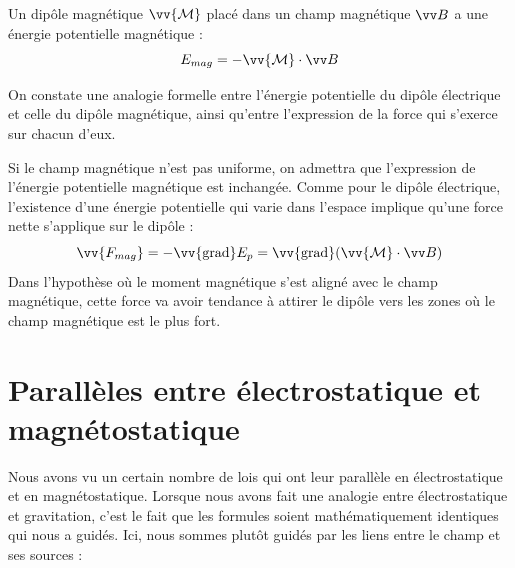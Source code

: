 \documentclass[11pt,fleqn]{book} %
\newcommand{\dd}{\mathrm{d}}
\newcommand{\grad}{\vv{\mathrm{grad}}}
\begin{document}
\begin{proposition}
    Un dipôle magnétique $\vv{\mathcal{M}}$ placé dans un champ magnétique $\vv B$ a une énergie potentielle magnétique :
    \begin{equation}
        E_{mag} = - \vv{\mathcal{M}} \cdot \vv B
    \end{equation}
\end{proposition}

On constate une analogie formelle entre l'énergie potentielle du dipôle électrique et celle du dipôle magnétique, ainsi qu'entre l'expression de la force qui s'exerce sur chacun d'eux.

Si le champ magnétique n'est pas uniforme, on admettra que l'expression de l'énergie potentielle magnétique est inchangée. Comme pour le dipôle électrique, l'existence d'une énergie potentielle qui varie dans l'espace implique qu'une force nette s'applique sur le dipôle :
\begin{equation}
    \vv{F_{mag}} = - \grad E_p =  \grad(\vv{\mathcal{M}} \cdot \vv B)
\end{equation}
Dans l'hypothèse où le moment magnétique s'est aligné avec le champ magnétique, cette force va avoir tendance à attirer le dipôle vers les zones où le champ magnétique est le plus fort.

\section{Parallèles entre électrostatique et magnétostatique}

Nous avons vu un certain nombre de lois qui ont leur parallèle en électrostatique et en magnétostatique. Lorsque nous avons fait une analogie entre électrostatique et gravitation, c'est le fait que les formules soient mathématiquement identiques qui nous a guidés. Ici, nous sommes plutôt guidés par les liens entre le champ et ses sources :
\end{document}
